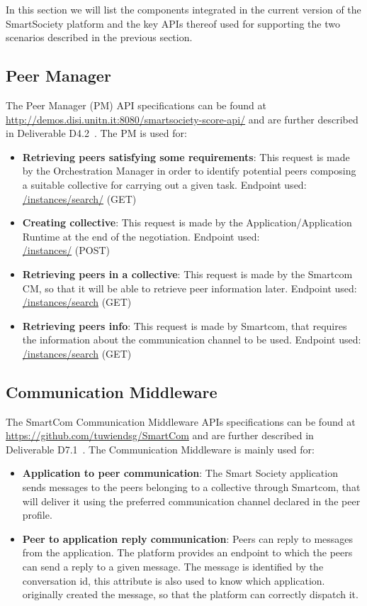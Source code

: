 In this section we will list the components integrated in the current
version of the SmartSociety platform and the key APIs thereof
used for supporting the two scenarios described in the previous
section.

\subsection{Peer Manager}
The Peer Manager (PM) API specifications can be found at
\url{http://demos.disi.unitn.it:8080/smartsociety-score-api/} and are further
described in Deliverable D4.2~\cite{D4.2}. The PM is used for:
\begin{itemize}
\item {\bf Retrieving peers satisfying some requirements}: This
  request is made by the Orchestration Manager in order to identify
  potential peers composing a suitable collective for carrying out a
  given task. Endpoint used:\\
	\url{/instances/search/} (\textsc{GET})
\item {\bf Creating collective}: This request is made by the Application/Application Runtime at the end of the negotiation. Endpoint used:\\
	\url{/instances/} (\textsc{POST})
\item {\bf Retrieving peers in a collective}: This request is made by
  the Smartcom CM, so that it will be able to retrieve peer information later. Endpoint used:\\
	\url{/instances/search} (\textsc{GET})
\item {\bf Retrieving peers info}: This request is made by Smartcom, that requires the information about the communication channel to be used. Endpoint used:\\
	\url{/instances/search} (\textsc{GET})	
\end{itemize}


\subsection{Communication Middleware}
The SmartCom Communication Middleware APIs specifications can be found at 
\url{https://github.com/tuwiendsg/SmartCom} and are further described in Deliverable D7.1~\cite{D7.1}. The Communication Middleware is mainly used for:
\begin{itemize}
\item {\bf Application to peer communication}: The Smart Society application sends messages to the peers belonging to a collective through Smartcom, that will deliver it using the preferred communication channel declared in the peer profile.
\item {\bf Peer to application reply communication}: Peers can reply to messages from the application. The platform provides an endpoint to which the peers can send a reply to a given message. The message is identified by the conversation id, this attribute is also used to know which application.
originally created the message, so that the platform can correctly dispatch it. 
\end{itemize}

